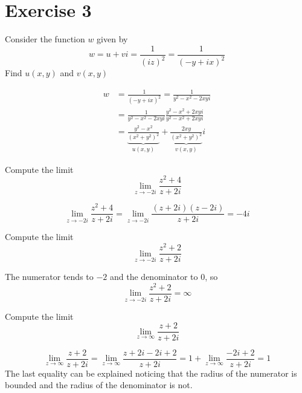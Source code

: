 \documentclass{report}
\begin{document}
    \section*{Exercise 3}
    \begin{tcolorbox}[title=Part a]
        Consider the function $w$ given by
        \begin{equation*}
            w = u + vi = \frac{1}{(iz)^2} = \frac{1}{(-y + ix)^2}
        \end{equation*}
        Find $u(x, y)$ and $v(x, y)$
    \end{tcolorbox}
    \noindent
    \begin{align*}
        w &= \frac{1}{(-y + ix)^2} = \frac{1}{y^2 - x^2 -2xyi} \\
        &= \frac{1}{y^2 - x^2 -2xyi} \frac{y^2 - x^2 + 2xyi}{y^2 - x^2 + 2xyi} \\
        &= \underbrace{\frac{y^2 - x^2}{(x^2 + y^2)^2}}_{u(x, y)} + \underbrace{\frac{2xy}{(x^2 + y^2)^2}}_{v(x, y)}i
    \end{align*}
    \begin{tcolorbox}[title=Part b.i]
        Compute the limit
        \begin{equation*}
            \lim_{z \to -2i}{\frac{z^2 + 4}{z + 2i}}
        \end{equation*}
    \end{tcolorbox}
    \begin{equation*}
        \lim_{z \to -2i}{\frac{z^2 + 4}{z + 2i}} = \lim_{z \to -2i}{\frac{(z + 2i)(z - 2i)}{z + 2i}} = -4i
    \end{equation*}
    \begin{tcolorbox}[title=Part b.ii]
        Compute the limit
        \begin{equation*}
            \lim_{z \to -2i}{\frac{z^2 + 2}{z + 2i}}
        \end{equation*}
    \end{tcolorbox}
    \noindent
    The numerator tends to $-2$ and the denominator to $0$, so
    \begin{equation*}
        \lim_{z \to -2i}{\frac{z^2 + 2}{z + 2i}} = \infty
    \end{equation*}
    \begin{tcolorbox}[title=Part b.iii]
        Compute the limit
        \begin{equation*}
            \lim_{z \to \infty}{\frac{z + 2}{z + 2i}}
        \end{equation*}
    \end{tcolorbox}
    \begin{equation*}
        \lim_{z \to \infty}{\frac{z + 2}{z + 2i}} = \lim_{z \to \infty}{\frac{z + 2i - 2i + 2}{z + 2i}} = 1 + \lim_{z \to \infty}{\frac{-2i + 2}{z + 2i}} = 1
    \end{equation*}
    The last equality can be explained noticing that the radius of the numerator is bounded and the radius of the denominator is not.
    
\end{document}

